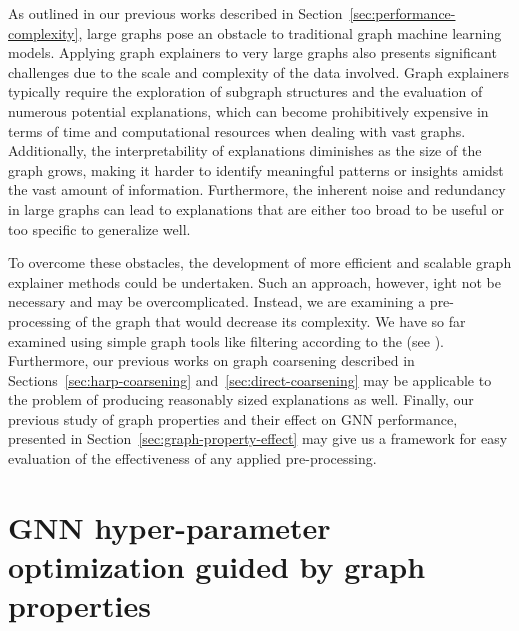 As outlined in our previous works described in Section~\ref{sec:performance-complexity}, large graphs pose an obstacle to traditional graph machine learning models. Applying graph explainers to very large graphs also presents significant challenges due to the scale and complexity of the data involved. Graph explainers typically require the exploration of subgraph structures and the evaluation of numerous potential explanations, which can become prohibitively expensive in terms of time and computational resources when dealing with vast graphs. Additionally, the interpretability of explanations diminishes as the size of the graph grows, making it harder to identify meaningful patterns or insights amidst the vast amount of information. Furthermore, the inherent noise and redundancy in large graphs can lead to explanations that are either too broad to be useful or too specific to generalize well.

To overcome these obstacles, the development of more efficient and scalable graph explainer methods could be undertaken. Such an approach, however, ight not be necessary and may be overcomplicated. Instead, we are examining a pre-processing of the graph that would decrease its complexity. We have so far examined using simple graph tools like filtering according to the  (see \cite{zhou_rich-club_2004}). Furthermore, our previous works on graph coarsening described in Sections~\ref{sec:harp-coarsening} and~\ref{sec:direct-coarsening} may be applicable to the problem of producing reasonably sized explanations as well. Finally, our previous study of graph properties and their effect on GNN performance, presented in Section~\ref{sec:graph-property-effect} may give us a framework for easy evaluation of the effectiveness of any applied pre-processing.

\section{GNN hyper-parameter optimization guided by graph properties}


